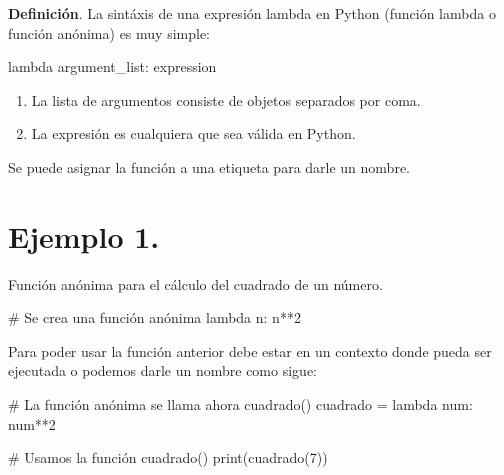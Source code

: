 \documentclass[
  letterpaper,
  DIV=11,
  numbers=noendperiod]{scrreprt}
\newenvironment{Shaded}{\begin{snugshade}}{\end{snugshade}}
\newcommand{\BuiltInTok}[1]{\textcolor[rgb]{0.00,0.23,0.31}{#1}}
\newcommand{\CommentTok}[1]{\textcolor[rgb]{0.37,0.37,0.37}{#1}}
\newcommand{\DecValTok}[1]{\textcolor[rgb]{0.68,0.00,0.00}{#1}}
\newcommand{\KeywordTok}[1]{\textcolor[rgb]{0.00,0.23,0.31}{#1}}
\newcommand{\NormalTok}[1]{\textcolor[rgb]{0.00,0.23,0.31}{#1}}
\newcommand{\OperatorTok}[1]{\textcolor[rgb]{0.37,0.37,0.37}{#1}}
\providecommand{\tightlist}{%
  \setlength{\itemsep}{0pt}\setlength{\parskip}{0pt}}\usepackage{longtable,booktabs,array}
\begin{document}
\textbf{Definición}. La sintáxis de una expresión lambda en Python
(función lambda o función anónima) es muy simple:

\begin{Shaded}
\begin{Highlighting}[]
\KeywordTok{lambda}\NormalTok{ argument\_list: expression}
\end{Highlighting}
\end{Shaded}

\begin{enumerate}
\def\labelenumi{\arabic{enumi}.}
\tightlist
\item
  La lista de argumentos consiste de objetos separados por coma.
\item
  La expresión es cualquiera que sea válida en Python.
\end{enumerate}

Se puede asignar la función a una etiqueta para darle un nombre.

\section{\texorpdfstring{\textbf{Ejemplo
1.}}{Ejemplo 1.}}\label{ejemplo-1.-2}

Función anónima para el cálculo del cuadrado de un número.

\begin{Shaded}
\begin{Highlighting}[]
\CommentTok{\# Se crea una función anónima}
\KeywordTok{lambda}\NormalTok{ n: n}\OperatorTok{**}\DecValTok{2}
\end{Highlighting}
\end{Shaded}

Para poder usar la función anterior debe estar en un contexto donde
pueda ser ejecutada o podemos darle un nombre como sigue:

\begin{Shaded}
\begin{Highlighting}[]
\CommentTok{\# La función anónima se llama ahora cuadrado()}
\NormalTok{cuadrado }\OperatorTok{=} \KeywordTok{lambda}\NormalTok{ num: num}\OperatorTok{**}\DecValTok{2}
\end{Highlighting}
\end{Shaded}

\begin{Shaded}
\begin{Highlighting}[]
\CommentTok{\# Usamos la función cuadrado()}
\BuiltInTok{print}\NormalTok{(cuadrado(}\DecValTok{7}\NormalTok{))}
\end{Highlighting}
\end{Shaded}
\end{document}
